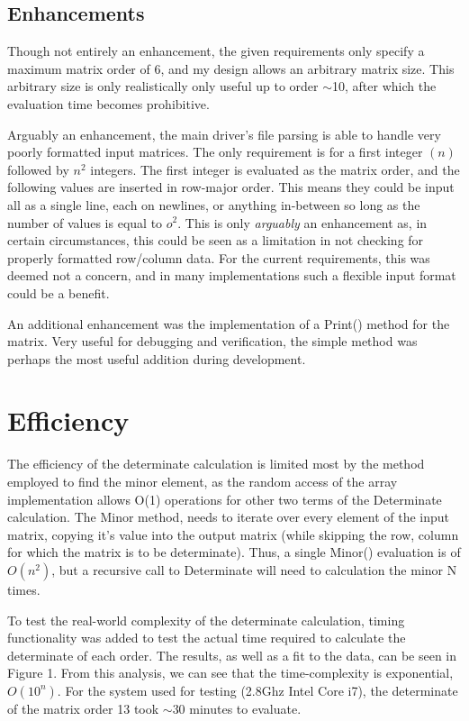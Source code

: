 \documentclass[a4paper,12pt]{article}
\begin{document}
\subsection{Enhancements}
Though not entirely an enhancement, the given requirements only specify a maximum matrix order of 6, and my design
allows an arbitrary matrix size.  This arbitrary size is only realistically only useful up to order $\sim$10, after which the evaluation time
becomes prohibitive. 

Arguably an enhancement, the main driver's file parsing is able to handle very poorly formatted input matrices.  The only requirement 
is for a first integer $(n)$ followed by $n^2$ integers.  The first integer is evaluated as the matrix order, and the following values are 
inserted in row-major order.  This means they could be input all as a single line, each on newlines, or anything in-between so long as
the number of values is equal to $o^2$.  This is only {\it arguably} an enhancement as, in certain circumstances, this could be seen as
a limitation in not checking for properly formatted row/column data.  For the current requirements, this was deemed not a concern, and in
many implementations such a flexible input format could be a benefit.

An additional enhancement was the implementation of a Print() method for the matrix.  Very useful for debugging and 
verification, the simple method was perhaps the most useful addition during development.



\section{Efficiency}
The efficiency of the determinate calculation is limited most by the method employed to find the minor element, as the 
random access of the array implementation allows O(1) operations for other two terms of the Determinate calculation.
The Minor method, needs to iterate over every element of the input matrix, copying it's value into the output matrix (while 
skipping the row, column for which the matrix is to be determinate).  Thus, a single Minor() evaluation is of $O(n^2)$, but a 
recursive call to Determinate will need to calculation the minor N times. 

To test the real-world complexity of the determinate calculation, timing functionality was added to test the actual time required
to calculate the determinate of each order. The results, as well as a fit to the data, can be seen in Figure 1.  From this analysis, we
can see that the time-complexity is exponential, $O(10^n)$.  For the system used for testing (2.8Ghz Intel Core i7), the determinate of 
the matrix order 13 took $\sim$30 minutes to evaluate.
\end{document}
